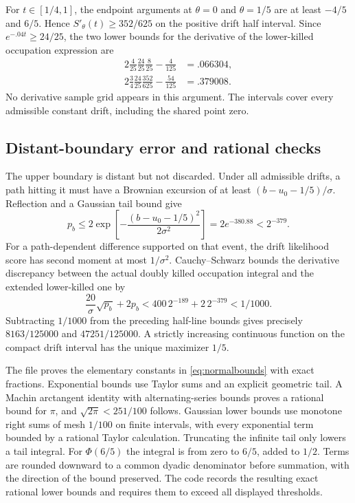 For $t\in[1/4,1]$, the endpoint arguments at $\theta=0$ and $\theta=1/5$ are at least $-4/5$ and $6/5$. Hence $S'_\theta(t)\ge352/625$ on the positive drift half interval. Since $e^{-.04t}\ge24/25$, the two lower bounds for the derivative of the lower-killed occupation expression are
\begin{align}
 2\frac4{25}\frac{24}{25}\frac8{25}-\frac4{125}&=.066304,\\
 2\frac34\frac{24}{25}\frac{352}{625}-\frac{54}{125}&=.379008.
\end{align}
No derivative sample grid appears in this argument. The intervals cover every admissible constant drift, including the shared point zero.

\subsection{Distant-boundary error and rational checks}
The upper boundary is distant but not discarded. Under all admissible drifts, a path hitting it must have a Brownian excursion of at least $(b-u_0-1/5)/\sigma$. Reflection and a Gaussian tail bound give
\begin{equation}
 p_b\le2\exp\left[-\frac{(b-u_0-1/5)^2}{2\sigma^2}\right]
 =2e^{-380.88}<2^{-379}.
\end{equation}
For a path-dependent difference supported on that event, the drift likelihood score has second moment at most $1/\sigma^2$. Cauchy--Schwarz bounds the derivative discrepancy between the actual doubly killed occupation integral and the extended lower-killed one by
\begin{equation}
 \frac{20}{\sigma}\sqrt{p_b}+2p_b
 <400\,2^{-189}+2\,2^{-379}<1/1000.
\end{equation}
Subtracting $1/1000$ from the preceding half-line bounds gives precisely $8163/125000$ and $47251/125000$. A strictly increasing continuous function on the compact drift interval has the unique maximizer $1/5$.

The file  proves the elementary constants in \eqref{eq:normalbounds} with exact fractions. Exponential bounds use Taylor sums and an explicit geometric tail. A Machin arctangent identity with alternating-series bounds proves a rational bound for $\pi$, and $\sqrt{2\pi}<251/100$ follows. Gaussian lower bounds use monotone right sums of mesh $1/100$ on finite intervals, with every exponential term bounded by a rational Taylor calculation. Truncating the infinite tail only lowers a tail integral. For $\Phi(6/5)$ the integral is from zero to $6/5$, added to $1/2$. Terms are rounded downward to a common dyadic denominator before summation, with the direction of the bound preserved. The code records the resulting exact rational lower bounds and requires them to exceed all displayed thresholds.

